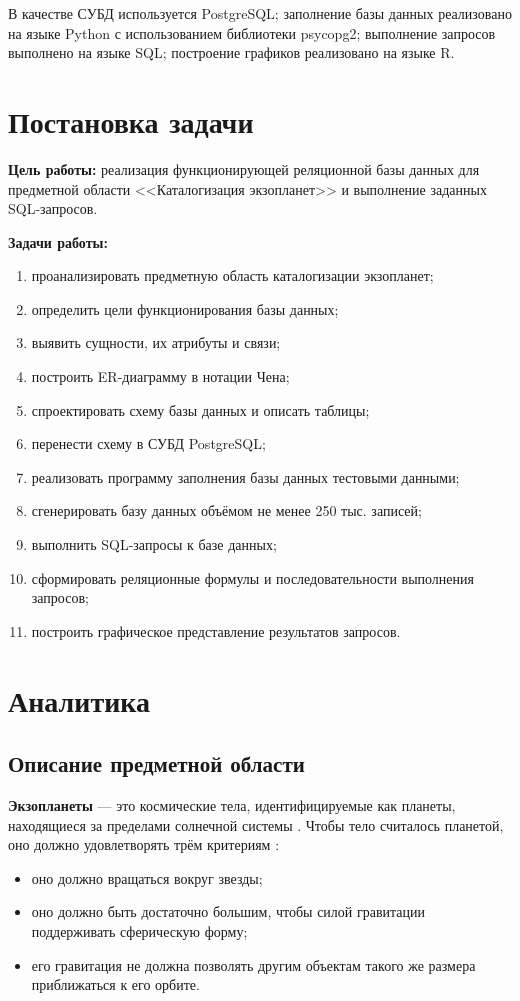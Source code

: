\documentclass[14pt,a4paper]{extarticle}
\begin{document}
	В качестве СУБД используется PostgreSQL; заполнение базы данных реализовано на языке Python с использованием библиотеки psycopg2; выполнение запросов выполнено на языке SQL; построение графиков реализовано на языке R.
	
	\newpage
	
	\section{Постановка задачи}
	
	\textbf{Цель работы:} реализация функционирующей реляционной базы данных для предметной области <<Каталогизация экзопланет>> и выполнение заданных SQL-запросов.
	
	\textbf{Задачи работы:}
	\begin{enumerate}
		\item проанализировать предметную область каталогизации экзопланет;
		\item определить цели функционирования базы данных;
		\item выявить сущности, их атрибуты и связи;
		\item построить ER-диаграмму в нотации Чена;
		\item спроектировать схему базы данных и описать таблицы;
		\item перенести схему в СУБД PostgreSQL;
		\item реализовать программу заполнения базы данных тестовыми данными;
		\item сгенерировать базу данных объёмом не менее 250 тыс. записей;
		\item выполнить SQL-запросы к базе данных;
		\item сформировать реляционные формулы и последовательности выполнения запросов;
		\item построить графическое представление результатов запросов.
	\end{enumerate}
	
	\newpage
	
	\section{Аналитика}
	\subsection{Описание предметной области}
	\label{object-description}
	
	\textbf{Экзопланеты} --- это космические тела, идентифицируемые как планеты, находящиеся за пределами солнечной системы \cite{exoplanet}. Чтобы тело считалось планетой, оно должно удовлетворять трём критериям \cite{planet}: 
	\begin{itemize}
		\item оно должно вращаться вокруг звезды; 
		\item оно должно быть достаточно большим, чтобы силой гравитации поддерживать сферическую форму; 
		\item его гравитация не должна позволять другим объектам такого же размера приближаться к его орбите.
	\end{itemize}
	
\end{document}
